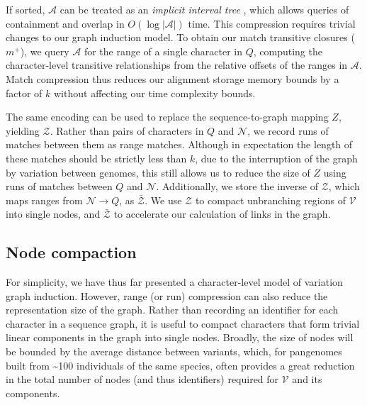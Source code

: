 \documentclass{bioinfo}
\theoremstyle{definition}
\begin{document}
If sorted, $\mathcal{A}$ can be treated as an \textit{implicit interval tree} \citep{Li_bedtk_2020}, which allows queries of containment and overlap in $O(\log |\mathcal{A}|)$ time.
This compression requires trivial changes to our graph induction model.
To obtain our match transitive closures ($m^+$), we query $\mathcal{A}$ for the range of a single character in $Q$, computing the character-level transitive relationships from the relative offsets of the ranges in $\mathcal{A}$.
Match compression thus reduces our alignment storage memory bounds by a factor of $k$ without affecting our time complexity bounds.

The same encoding can be used to replace the sequence-to-graph mapping $Z$, yielding $\mathcal{Z}$.
Rather than pairs of characters in $Q$ and $\mathcal{N}$, we record runs of matches between them as range matches.
Although in expectation the length of these matches should be strictly less than $k$, due to the interruption of the graph by variation between genomes, this still allows us to reduce the size of $Z$ using runs of matches between $Q$ and $\mathcal{N}$.
Additionally, we store the inverse of $\mathcal{Z}$, which maps ranges from $\mathcal{N} \to Q$, as $\bar{\mathcal{Z}}$.
We use $\mathcal{Z}$ to compact unbranching regions of $\mathcal{V}$ into single nodes, and $\bar{\mathcal{Z}}$ to accelerate our calculation of links in the graph.




\subsection{Node compaction}

For simplicity, we have thus far presented a character-level model of variation graph induction.
However, range (or run) compression can also reduce the representation size of the graph.
Rather than recording an identifier for each character in a sequence graph, it is useful to compact characters that form trivial linear components in the graph into single nodes.
Broadly, the size of nodes will be bounded by the average distance between variants, which, for pangenomes built from \textasciitilde100 individuals of the same species, often provides a great reduction in the total number of nodes (and thus identifiers) required for $\mathcal{V}$ and its components.
\end{document}
